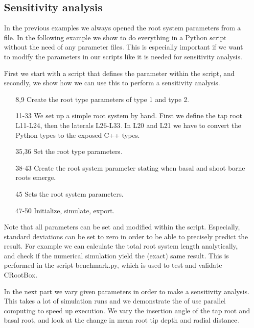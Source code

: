 \documentclass[a4paper]{article}
\begin{document}
\subsection{Sensitivity analysis} \label{sec:sa}

In the previous examples we always opened the root system parameters from a file. 
In the following example we show to do everything in a Python script without the need of any parameter files. 
This is especially important if we want to modify the parameters in our scripts like it is needed for sensitivity analysis. 

First we start with a script that defines the parameter within the script, and secondly, we show how we can use this to perform a sensitivity analysis.



\begin{itemize}

\item[8,9] Create the root type parameters of type 1 and type 2.
\item[11-33] We set up a simple root system by hand. First we define the tap root L11-L24, then the laterals L26-L33. In L20 and L21 we have to convert the Python types to the exposed C++ types.
\item[35,36] Set the root type parameters.

\item[38-43] Create the root system parameter stating when basal and shoot borne roots emerge.

\item[45] Sets the root system parameters.

\item[47-50] Initialize, simulate, export. 

\end{itemize}

Note that all parameters can be set and modified within the script. Especially, standard deviations can be set to zero in order to be able to precisely predict the result. 
For example we can calculate the total root system length analytically, and check if the numerical simulation yield the (exact) same result. 
This is performed in the script benchmark.py, which is used to test and validate CRootBox.

In the next part we vary given parameters in order to make a sensitivity analysis. This takes a lot of simulation runs and we demonstrate the of use parallel computing to speed up execution.
We vary the insertion angle of the tap root and basal root, and look at the change in mean root tip depth and radial distance. 
\end{document}
